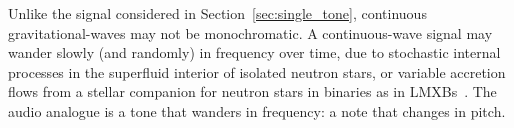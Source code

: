 \documentclass[paper-main.tex]{subfiles}
\begin{document}

Unlike the signal considered in Section~\ref{sec:single_tone}, continuous gravitational-waves may not be monochromatic.
A continuous-wave signal may wander slowly (and randomly) in frequency over time, due to stochastic internal processes in the superfluid interior of isolated neutron stars\cite{MelatosDouglassSimula:2015,Jones:2010}, or variable accretion flows from a stellar companion for neutron stars in binaries as in LMXBs~\cite{BildstenTB:1998}. 
The audio analogue is a tone that wanders in frequency: a note that changes in pitch. 
\end{document}
